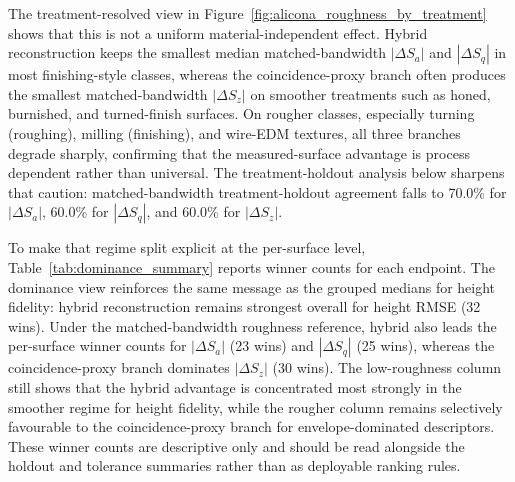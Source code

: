 \documentclass[photonics,article,submit,pdftex,moreauthors]{Definitions/mdpi}
\begin{document}
The treatment-resolved view in Figure~\ref{fig:alicona_roughness_by_treatment} shows that this is not a uniform material-independent effect. Hybrid reconstruction keeps the smallest median matched-bandwidth $|\Delta S_a|$ and $|\Delta S_q|$ in most finishing-style classes, whereas the coincidence-proxy branch often produces the smallest matched-bandwidth $|\Delta S_z|$ on smoother treatments such as honed, burnished, and turned-finish surfaces. On rougher classes, especially turning (roughing), milling (finishing), and wire-EDM textures, all three branches degrade sharply, confirming that the measured-surface advantage is process dependent rather than universal. The treatment-holdout analysis below sharpens that caution: matched-bandwidth treatment-holdout agreement falls to 70.0\% for $|\Delta S_a|$, 60.0\% for $|\Delta S_q|$, and 60.0\% for $|\Delta S_z|$.

To make that regime split explicit at the per-surface level, Table~\ref{tab:dominance_summary} reports winner counts for each endpoint. The dominance view reinforces the same message as the grouped medians for height fidelity: hybrid reconstruction remains strongest overall for height RMSE (32 wins). Under the matched-bandwidth roughness reference, hybrid also leads the per-surface winner counts for $|\Delta S_a|$ (23 wins) and $|\Delta S_q|$ (25 wins), whereas the coincidence-proxy branch dominates $|\Delta S_z|$ (30 wins). The low-roughness column still shows that the hybrid advantage is concentrated most strongly in the smoother regime for height fidelity, while the rougher column remains selectively favourable to the coincidence-proxy branch for envelope-dominated descriptors. These winner counts are descriptive only and should be read alongside the holdout and tolerance summaries rather than as deployable ranking rules.


\end{document}
